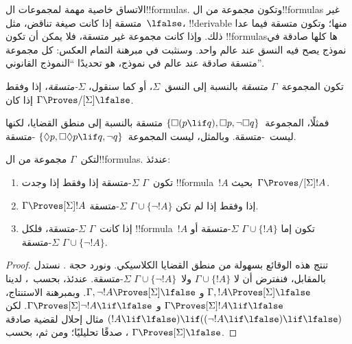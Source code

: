 \documentclass[../../../include/open-logic-section]{subfiles}
\begin{document}


الاتساق خاصية مهمة لمجموعات ال!!{formula}s. وتكون مجموعة من
ال!!{formula}s غير متسقة إذا كانت صيغة تناقض، مثل~$\lfalse$،
!!{derivable} منها؛ وتكون متسقة فيما عدا ذلك. وإذا كانت مجموعة غير متسقة،
فلا يمكن أن تكون !!{formula}sها كلها صادقة في نموذج يصح فيه النسق عند عالم واحد.
وسنثبت في مبرهنة التمام العكس: كل مجموعة متسقة صادقة عند عالم في نموذج،
هو تحديدًا ``النموذج القانوني''.

\begin{defn}
  تكون المجموعة~$\Gamma$ \emph{متسقة} بالنسبة إلى النسق~$\Sigma$، أو
  كما سنقول، \emph{$\Sigma$-متسقة}، إذا وفقط إذا كان
  $\Gamma \Proves/[\Sigma] \lfalse$.
\end{defn}

فمثلًا، المجموعة~$\{\Box(p \lif q), \Box p, \lnot\Box q\}$ متسقة
بالنسبة إلى منطق القضايا، لكنها ليست~-متسقة. وبالمثل، ليست
المجموعة~$\{\Diamond p, \Box\Diamond p \lif q, \lnot q\}$
-متسقة.

\begin{prop}
  لتكن~$\Gamma$ مجموعة من ال!!{formula}s. عندئذ:
  \begin{enumerate}
  \item تكون~$\Gamma$ $\Sigma$-متسقة إذا وفقط إذا وجدت
    !!{formula}~$!A$ بحيث~$\Gamma \Proves/[\Sigma] !A$.
  \item {}%
    $\Gamma \Proves[\Sigma] !A$ إذا وفقط إذا لم تكن
    $\Gamma \cup \{\lnot!A\}$ $\Sigma$-متسقة.
  \item {}%
    إذا كانت~$\Gamma$ $\Sigma$-متسقة، فلكل !!{formula}~$!A$ تكون إما
    $\Gamma \cup \{!A\}$ $\Sigma$-متسقة أو
    $\Gamma \cup \{\lnot!A\}$ $\Sigma$-متسقة.
  \end{enumerate}
\end{prop}

\begin{proof}
  تنتج هذه الوقائع بسهولة من منطق القضايا الكلاسيكي. ونورد حجة
  . نستدل بالمقابل، فنفترض أن لا
  $\Gamma \cup \{!A\}$ ولا~$\Gamma \cup \{\lnot!A\}$
  $\Sigma$-متسقة. عندئذ، بحسب~، لدينا
  $\Gamma, !A \Proves[\Sigma] \lfalse$ و
  $\Gamma, \lnot !A \Proves[\Sigma] \lfalse$. وبمبرهنة الاستنتاج،
  $\Gamma \Proves[\Sigma] !A \lif \lfalse$ و
  $\Gamma \Proves[\Sigma] \lnot!A \lif \lfalse$. لكن
  $(!A \lif \lfalse) \lif ((\lnot!A \lif \lfalse) \lif \lfalse)$
  مثال إحلال لقضية صادقة صدقًا تحليليًا؛ ومن ثم، بحسب
  ،
  $\Gamma \Proves[\Sigma] \lfalse$.
\end{proof}
\end{document}

